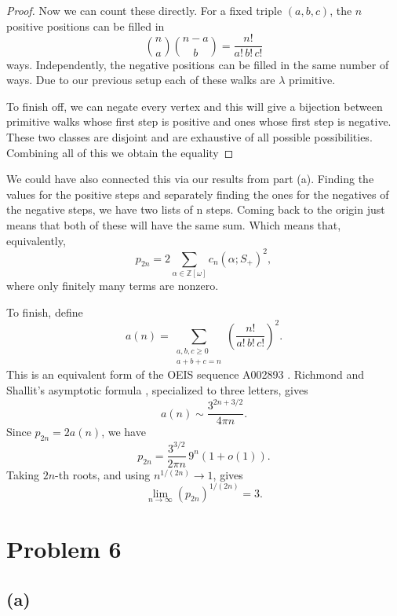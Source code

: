 \documentclass[11pt]{scrartcl}
\begin{document}
\begin{soln}
\begin{proof}
		Now we can count these directly.  For a fixed triple $(a,b,c)$, the $n$ positive positions can be filled
		in
		\[
		\binom{n}{a}\binom{n-a}{b}
		=\frac{n!}{a!\,b!\,c!}
		\]
		ways. Independently, the negative positions can be filled in the same
		number of ways. Due to our previous setup each of these walks are $\lambda$ primitive.
		
		To finish off, we can negate every vertex and this will give a bijection between primitive walks whose first step is positive and ones whose first step is negative. These two classes are disjoint and are exhaustive of all possible possibilities.
		Combining all of this we obtain the equality
	\end{proof}
	
	We could have also connected this via our results from part (a). Finding the values for the positive steps and separately finding the ones for the negatives of the negative steps, we have two lists of n steps. Coming back to the origin just means that both of these will have the same sum.  Which means that, equivalently,
	\[
	p_{2n}
	=2\sum_{\alpha\in\mathbb Z[\omega]}
	c_n(\alpha;S_+)^2,
	\]
	where only finitely many terms are nonzero.
	
To finish, define
\[
a(n)=\sum_{\substack{a,b,c\ge0\\a+b+c=n}}
\left(\frac{n!}{a!\,b!\,c!}\right)^2.
\]
This is an equivalent form of the OEIS sequence A002893 \cite{oeis_A002893}.
Richmond and Shallit's asymptotic formula
\cite[Theorem~4]{richmond-shallit}, specialized to three letters, gives
\[
a(n)\sim\frac{3^{2n+3/2}}{4\pi n}.
\]
Since $p_{2n}=2a(n)$, we have
\[
p_{2n}
=\frac{3^{3/2}}{2\pi n}\,9^n(1+o(1)).
\]
Taking $2n$-th roots, and using $n^{1/(2n)}\to1$, gives
\[
\boxed{\lim_{n\to\infty}(p_{2n})^{1/(2n)}=3.}
\]
\end{soln}
\newpage

\section{Problem 6}
\subsection{(a)}
\end{document}
